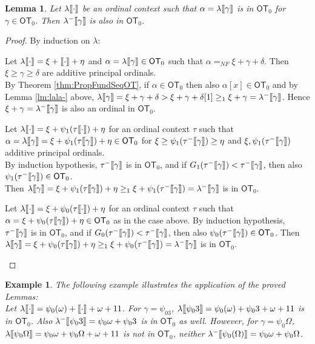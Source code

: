 \documentclass{amsart}
\theoremstyle{plain}
\theoremstyle{plain}
\newtheorem{lemma}[theorem]{Lemma}
\newtheorem{example}[theorem]{Example}
\def\scbrl{[\hspace{-.14em}[}
\def\scbrr{]\hspace{-.14em}]}
\def\scbr#1{\scbrl#1\scbrr}
\newcommand\OT{\mathsf{OT}}
\newcommand{\Om}{{\Omega}}
\newcommand{\al}{{\alpha}}
\newcommand{\ga}{\gamma}
\newcommand{\de}{\delta}
\newcommand{\la}{\lambda}
\newcommand{\om}{\omega}
\def\scbrl{[\hspace{-.14em}[}
\def\scbrr{]\hspace{-.14em}]}
\def\scbr#1{\scbrl#1\scbrr}
\begin{document}
\begin{lemma}
Let $\la\scbr{\cdot}$ be an ordinal context such that $\al =\la\scbr{\ga}$ is in $\OT_0$ for $\ga\in \OT_0$. Then $\la^-\scbr{\ga}$ is also in $\OT_0$.\medskip
\end{lemma}
\begin{proof}
By induction on $\la$:
\begin{Cases}
    \item  Let $\la\scbr{\cdot}=\xi +\scbr{\cdot} + \eta$ and $\al =\la\scbr{\ga} \in \OT_0$ such that $\al =_{NF} \xi + \ga + \de$. 
    Then $\xi\geq \ga \geq \de$ are additive principal ordinals.\\ 
    By Theorem \ref{thm:PropFundSeqOT}, if $\al\in \OT_0$ then also $\al[x] \in \OT_0$ and by Lemma \ref{lm:lala-} above,
    $\la\scbr{\ga}= \xi + \ga + \de > \xi + \ga + \de[1] \geq_1 \xi + \ga= \la^-\scbr{\ga}$.
    Hence $\xi+\ga = \la^-\scbr{\ga}$ is also an ordinal in $\OT_0$.\medskip
    
    \item  Let $\la\scbr{\cdot}=\xi+ \psi_1(\tau{\scbr{\cdot}})+\eta$ for an ordinal context $\tau$ such that $\al=\la\scbr{\ga} =\xi+\psi_1(\tau\scbr{\ga})+\eta \in \OT_0$ for  $\xi\geq \psi_1(\tau^-\scbr{\ga}) \geq \eta$ and $\xi,  \psi_1(\tau^-\scbr{\ga}) $ additive principal ordinals.
    \\
    By induction hypothesis, $\tau^-{\scbr{\ga}}$ is in $\OT_0$, and if $G_1(\tau^-{\scbr{\ga}})< \tau^-{\scbr{\ga}}$, then 
    also $\psi_1(\tau^-\scbr{\ga}) \in \OT_0$.
    \\
    Then $\la\scbr{\ga}= \xi+\psi_1(\tau\scbr{\ga})+\eta \geq_1 \xi+ \psi_1(\tau^-{\scbr{\ga}}) =\la^-\scbr{\ga}$ is in $\OT_0$.\medskip
    
    \item Let $\la\scbr{\cdot}=\xi+ \psi_0(\tau{\scbr{\cdot}})+\eta$ for an ordinal context $\tau$ such that $\al= \xi+\psi_0(\tau\scbr{\ga})+\eta  \in \OT_0$ as in the case above.
    By induction hypothesis, $\tau^-{\scbr{\ga}}$ is in $\OT_0$, and if $G_0(\tau^-{\scbr{\ga}})< \tau^-{\scbr{\ga}}$, then 
    also $\psi_0(\tau^-\scbr{\ga}) \in \OT_0$.
    Then $\la\scbr{\ga}= \xi+\psi_0(\tau\scbr{\ga})+\eta \geq_1 \xi+ \psi_0(\tau^-{\scbr{\ga}}) =\la^-\scbr{\ga}$ is in $\OT_0$.
    
\end{Cases}
\end{proof}

\smallskip
\begin{example} The following example illustrates the application of the proved Lemmas:\\
Let $\la\scbr{\cdot} = \psi_0(\om) + \scbr{\cdot} +\om +11$.
For $\ga= \psi_03$, $\la\scbr{\psi_03} = \psi_0(\om) + \psi_03 +\om +11$ is in $\OT_0$. Also $\la^-\scbr{\psi_0 3} = \psi_0\om + \psi_03$  is in $\OT_0$ as well.
However, for $\ga=\psi_0\Om$, $\la\scbr{\psi_0\Om} = \psi_0\om + \psi_0\Om +\om+11$ is not in $\OT_0$, neither $\la^-\scbr{\psi_0(\Om)} = \psi_0\om +\psi_0\Om$.\medskip
\end{example}
\end{document}
